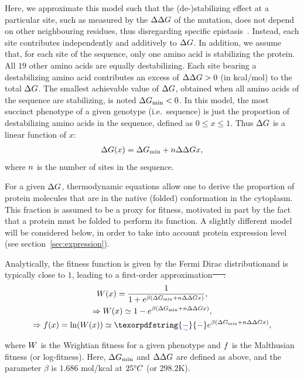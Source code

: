 \documentclass[authoryear]{elsarticle} %
\providecommand{\DIFaddtex}[1]{{\protect\color{blue}\uwave{#1}}} %
\providecommand{\DIFdeltex}[1]{{\protect\color{red}\sout{#1}}}                      %
\providecommand{\DIFaddbegin}{} %
\providecommand{\DIFaddend}{} %
\providecommand{\DIFdelbegin}{} %
\providecommand{\DIFdelend}{} %
\providecommand{\DIFadd}[1]{\texorpdfstring{\DIFaddtex{#1}}{#1}} %
\providecommand{\DIFdel}[1]{\texorpdfstring{\DIFdeltex{#1}}{}} %
\begin{document}
Here, we approximate this model such that the (de-)stabilizing effect at a particular site, such as measured by the $\Delta \Delta G$ of the mutation, does not depend on other neighbouring residues, thus disregarding specific epistasis~\citep{Dasmeh2014}.
Instead, each site contributes independently and additively to $\Delta G$.
In addition, we assume that, for each site of the sequence, only one amino acid is stabilizing the protein.
All $19$ other amino acids are equally destabilizing.
Each site bearing a destabilizing amino acid contributes an excess of $\Delta \Delta G > 0$ (in kcal/mol) to the total $\Delta G$.
The smallest achievable value of $\Delta G$, obtained when all amino acids of the sequence are stabilizing, is noted $ \Delta G_{\text{min}} < 0$.
In this model, the most succinct {phenotype} of a given genotype (i.e.~sequence) is just the proportion of destabilizing amino acids in the sequence, defined as $0 \leq x \leq 1$.
Thus $\Delta G$ is a linear function of $x$:
\begin{align}
    \Delta G (x) = \Delta G_{\text{min}} + n \Delta \Delta G x,
\end{align}
where $n$ is the number of sites in the sequence.

For a given $\Delta G$, thermodynamic equations allow one to derive the proportion of protein molecules that are in the native (folded) conformation in the cytoplasm.
This fraction is assumed to be a proxy for fitness, motivated in part by the fact that a protein must be folded to perform its function.
A slightly different model will be considered below, in order to take into account protein expression level (see section~\ref{sec:expression}).

Analytically, the fitness function is given by the Fermi Dirac distribution\DIFaddbegin \DIFadd{~\mbox{%
\citep{Goldstein2011} }\hspace{0pt}%
}\DIFaddend and is typically close to $1$\DIFaddbegin \DIFadd{~\mbox{%
\citep{Serohijos2014}}\hspace{0pt}%
}\DIFaddend , leading to a first-order approximation\DIFdelbegin \DIFdel{~\mbox{%
\citep{Goldstein2011}}\hspace{0pt}%
:
}\DIFdelend \DIFaddbegin \DIFadd{:
}\DIFaddend \begin{gather}
    \wrightfit (x) = \dfrac{1}{1 + e^{\beta (\EmpiricalDeltaGmin + \NbrSites \EmpiricalDeltaDeltaG x)}},\\
    \Rightarrow \wrightfit (x) \simeq 1 - e^{\beta (\EmpiricalDeltaGmin + \NbrSites \EmpiricalDeltaDeltaG x)},\\
    \Rightarrow \logfit (x) = \ln ( \wrightfit (x) ) \simeq \DIFaddbegin \DIFadd{- }\DIFaddend e^{\beta (\EmpiricalDeltaGmin + \NbrSites \EmpiricalDeltaDeltaG x)},
\end{gather}
where $W$ is the Wrightian fitness for a given {phenotype} and $f $ is the Malthusian fitness (or log-fitness).
Here, $\Delta G_{\text{min}}$ and $\Delta \Delta G$ are defined as above, and the parameter $\beta$ is $1.686$ mol/kcal at $25 \degree C$ (or $298.2$K).
\end{document}
